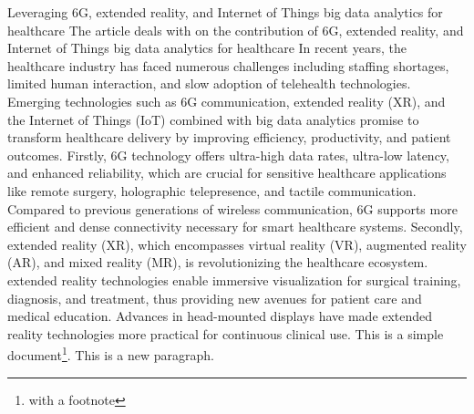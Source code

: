 \documentclass[a4paper,12pt]{article} %
\begin{document}
Leveraging 6G, extended reality, and Internet of Things big data analytics for healthcare
The article deals with  on the contribution of 6G, extended reality, and Internet of Things big data analytics for healthcare
In recent years, the healthcare industry has faced numerous challenges including staffing shortages, limited human interaction, and slow adoption of telehealth technologies. Emerging technologies such as 6G communication, extended reality (XR), and the Internet of Things (IoT) combined with big data analytics promise to transform healthcare delivery by improving efficiency, productivity, and patient outcomes.
Firstly, 6G technology offers ultra-high data rates, ultra-low latency, and enhanced reliability, which are crucial for sensitive healthcare applications like remote surgery, holographic telepresence, and tactile communication. Compared to previous generations of wireless communication, 6G supports more efficient and dense connectivity necessary for smart healthcare systems.
Secondly, extended reality (XR), which encompasses virtual reality (VR), augmented reality (AR), and mixed reality (MR), is revolutionizing the healthcare ecosystem. extended reality technologies enable immersive visualization for surgical training, diagnosis, and treatment, thus providing new avenues for patient care and medical education. Advances in head-mounted displays have made extended reality technologies more practical for continuous clinical use.
This is a simple
document\footnote{with a footnote}.
This is a new paragraph.
\end{document}

